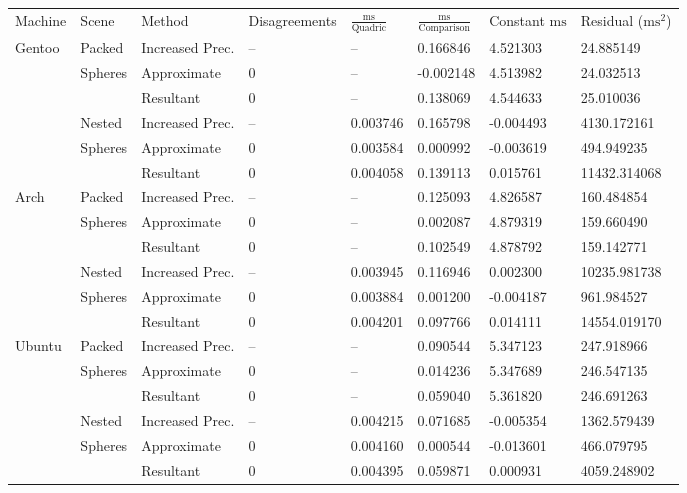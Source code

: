 \begin{tabular}{|l|l|ll|lll|l|}
\hline
Machine & Scene & Method & Disagreements & $\frac{\text{ms}}{\text{Quadric}}$ & $\frac{\text{ms}}{\text{Comparison}}$ & Constant $\text{ms}$ & Residual ($\text{ms}^2$)\\
\hhline{|=|=|==|===|=|}
Gentoo & Packed & Increased Prec. & -- & -- & 0.166846 & 4.521303 & 24.885149\\
& Spheres & Approximate & 0 & -- & -0.002148 & 4.513982 & 24.032513\\
&& Resultant & 0 & -- & 0.138069 & 4.544633 & 25.010036\\
\hline
& Nested & Increased Prec. & -- & 0.003746 & 0.165798 & -0.004493 & 4130.172161\\
& Spheres & Approximate & 0 & 0.003584 & 0.000992 & -0.003619 & 494.949235\\
&& Resultant & 0 & 0.004058 & 0.139113 & 0.015761 & 11432.314068\\
\hline
Arch & Packed & Increased Prec. & -- & -- & 0.125093 & 4.826587 & 160.484854\\
& Spheres & Approximate & 0 & -- & 0.002087 & 4.879319 & 159.660490\\
&& Resultant & 0 & -- & 0.102549 & 4.878792 & 159.142771\\
\hline
& Nested & Increased Prec. & -- & 0.003945 & 0.116946 & 0.002300 & 10235.981738\\
& Spheres & Approximate & 0 & 0.003884 & 0.001200 & -0.004187 & 961.984527\\
&& Resultant & 0 & 0.004201 & 0.097766 & 0.014111 & 14554.019170\\
\hline
Ubuntu & Packed & Increased Prec. & -- & -- & 0.090544 & 5.347123 & 247.918966\\
& Spheres & Approximate & 0 & -- & 0.014236 & 5.347689 & 246.547135\\
&& Resultant & 0 & -- & 0.059040 & 5.361820 & 246.691263\\
\hline
& Nested & Increased Prec. & -- & 0.004215 & 0.071685 & -0.005354 & 1362.579439\\
& Spheres & Approximate & 0 & 0.004160 & 0.000544 & -0.013601 & 466.079795\\
&& Resultant & 0 & 0.004395 & 0.059871 & 0.000931 & 4059.248902\\
\hline
\end{tabular}
